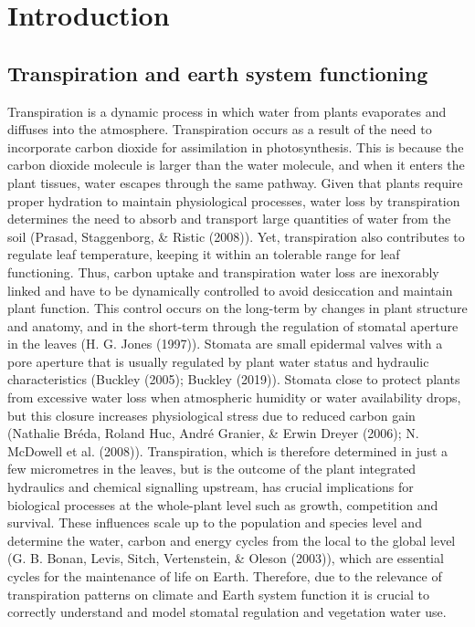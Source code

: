 \documentclass[11pt,twoside]{reedthesis}
\begin{document}
\captionsetup[figure]{font=small} \setlength{\parindent}{30pt}
\setlength{\parskip}{0.2cm plus4mm minus3mm}

\chapter{Introduction}\label{introduction}

\newpage

\section{Transpiration and earth system
functioning}\label{transpiration-and-earth-system-functioning}

Transpiration is a dynamic process in which water from plants evaporates
and diffuses into the atmosphere. Transpiration occurs as a result of
the need to incorporate carbon dioxide for assimilation in
photosynthesis. This is because the carbon dioxide molecule is larger
than the water molecule, and when it enters the plant tissues, water
escapes through the same pathway. Given that plants require proper
hydration to maintain physiological processes, water loss by
transpiration determines the need to absorb and transport large
quantities of water from the soil (Prasad, Staggenborg, \& Ristic
(2008)). Yet, transpiration also contributes to regulate leaf
temperature, keeping it within an tolerable range for leaf functioning.
Thus, carbon uptake and transpiration water loss are inexorably linked
and have to be dynamically controlled to avoid desiccation and maintain
plant function. This control occurs on the long-term by changes in plant
structure and anatomy, and in the short-term through the regulation of
stomatal aperture in the leaves (H. G. Jones (1997)). Stomata are small
epidermal valves with a pore aperture that is usually regulated by plant
water status and hydraulic characteristics (Buckley (2005); Buckley
(2019)). Stomata close to protect plants from excessive water loss when
atmospheric humidity or water availability drops, but this closure
increases physiological stress due to reduced carbon gain (Nathalie
Bréda, Roland Huc, André Granier, \& Erwin Dreyer (2006); N. McDowell et
al. (2008)). Transpiration, which is therefore determined in just a few
micrometres in the leaves, but is the outcome of the plant integrated
hydraulics and chemical signalling upstream, has crucial implications
for biological processes at the whole-plant level such as growth,
competition and survival. These influences scale up to the population
and species level and determine the water, carbon and energy cycles from
the local to the global level (G. B. Bonan, Levis, Sitch, Vertenstein,
\& Oleson (2003)), which are essential cycles for the maintenance of
life on Earth. Therefore, due to the relevance of transpiration patterns
on climate and Earth system function it is crucial to correctly
understand and model stomatal regulation and vegetation water use.\par
\end{document}
